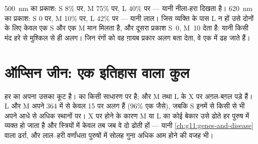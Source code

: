 \begin{example}[वक्र पढ़ना]\label{ex:g11:the-eye:curves}
\qty{500}{nm} का प्रकाश: S  8\% पर, M 75\% पर, L 40\% पर --- यानी
नीला-हरा दिखता है। \qty{620}{nm} का प्रकाश: S 0 पर, M 10\% पर, L 42\%
पर --- यानी लाल। जिस व्यक्ति के पास L  न हों उसे दोनों के लिए केवल एक
S और एक M मान मिलता है, और दूसरा प्रकाश S~0, M~10 देता है: यानी किसी मंद
हरे से मुश्किल से ही अलग। जिन रंगों को वह ग़ायब प्रकार अलग बता देता, वे एक
में ढह जाते हैं।
\end{example}

\section{ऑप्सिन जीन: एक इतिहास वाला कुल}

\begin{proposition}[ऑप्सिनों के जीन]\label{prop:g11:the-eye:genes}
हर  का अपना  उसका कूट है।  का  किसी साधारण  पर
है; और M तथा L  के  X  पर अग़ल-बग़ल पड़े हैं। L और M
 अपने 364  में से केवल 15 पर अलग हैं (96\% एक जैसे),
जबकि S  इनमें से किसी से भी अपने आधे से अधिक स्थानों पर। X पर होने
के कारण M या L का कोई बेकार  उसे ढोते हर पुरुष में व्यक्त हो जाता है
और स्त्रियों में केवल तब जब वे दो ढोती हों --- यानी
\cref{ch:g11:genes-and-disease} वाला ढर्रा, और लाल--हरी वर्णांधता पुरुषों
में सोलह गुना अधिक आम होने की वजह भी।
\end{proposition}
\admitted

